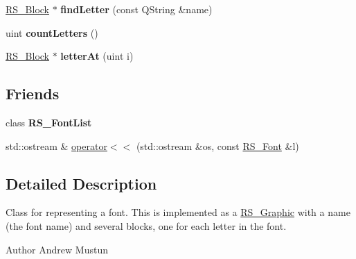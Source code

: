 \begin{DoxyCompactItemize}
\item 
\hypertarget{classRS__Font_afdb6fb2873f1ade286def4a82a9c81f9}{\hyperlink{classRS__Block}{R\-S\-\_\-\-Block} $\ast$ {\bfseries find\-Letter} (const Q\-String \&name)}\label{classRS__Font_afdb6fb2873f1ade286def4a82a9c81f9}

\item 
\hypertarget{classRS__Font_acec01ec6fc2ba713778def846bd31c66}{uint {\bfseries count\-Letters} ()}\label{classRS__Font_acec01ec6fc2ba713778def846bd31c66}

\item 
\hypertarget{classRS__Font_a8d6285e3dafa5076c34465fc507d32df}{\hyperlink{classRS__Block}{R\-S\-\_\-\-Block} $\ast$ {\bfseries letter\-At} (uint i)}\label{classRS__Font_a8d6285e3dafa5076c34465fc507d32df}

\end{DoxyCompactItemize}
\subsection*{Friends}
\begin{DoxyCompactItemize}
\item 
\hypertarget{classRS__Font_ac79ca0f74093a0efbe5e1527c27a579a}{class {\bfseries R\-S\-\_\-\-Font\-List}}\label{classRS__Font_ac79ca0f74093a0efbe5e1527c27a579a}

\item 
std\-::ostream \& \hyperlink{classRS__Font_af37e2008b29f49813065481e689b516f}{operator$<$$<$} (std\-::ostream \&os, const \hyperlink{classRS__Font}{R\-S\-\_\-\-Font} \&l)
\end{DoxyCompactItemize}


\subsection{Detailed Description}
Class for representing a font. This is implemented as a \hyperlink{classRS__Graphic}{R\-S\-\_\-\-Graphic} with a name (the font name) and several blocks, one for each letter in the font.

\begin{DoxyAuthor}{Author}
Andrew Mustun 
\end{DoxyAuthor}


